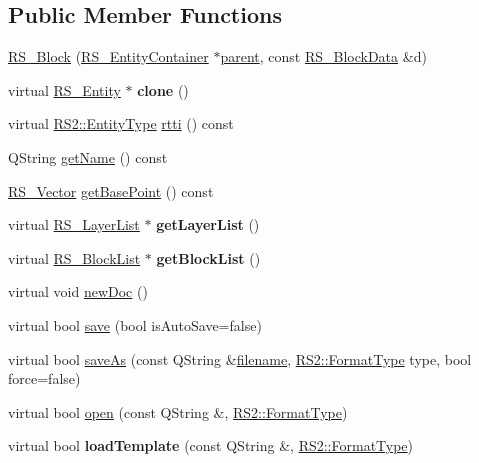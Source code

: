 \subsection*{Public Member Functions}
\begin{DoxyCompactItemize}
\item 
\hyperlink{classRS__Block_a6b07340f917f5fc95285761d3d46c391}{R\-S\-\_\-\-Block} (\hyperlink{classRS__EntityContainer}{R\-S\-\_\-\-Entity\-Container} $\ast$\hyperlink{classRS__Entity_a80358a8d2fc6739a516a278dc500b49f}{parent}, const \hyperlink{classRS__BlockData}{R\-S\-\_\-\-Block\-Data} \&d)
\item 
\hypertarget{classRS__Block_ab296caf344c57e9cf1f63a2e86312b38}{virtual \hyperlink{classRS__Entity}{R\-S\-\_\-\-Entity} $\ast$ {\bfseries clone} ()}\label{classRS__Block_ab296caf344c57e9cf1f63a2e86312b38}

\item 
virtual \hyperlink{classRS2_a8f26d1b981e1e85cff16738b43337e6a}{R\-S2\-::\-Entity\-Type} \hyperlink{classRS__Block_acfe58f363ff7e72ac42d51dbfd3f0b71}{rtti} () const 
\item 
Q\-String \hyperlink{classRS__Block_ac6d7125aa8638c743adbbe6b275ca304}{get\-Name} () const 
\item 
\hyperlink{classRS__Vector}{R\-S\-\_\-\-Vector} \hyperlink{classRS__Block_aa4f776303c15ed622bba648945e42738}{get\-Base\-Point} () const 
\item 
\hypertarget{classRS__Block_a74bcc0830b2d5c8bf8930ec7509dafb5}{virtual \hyperlink{classRS__LayerList}{R\-S\-\_\-\-Layer\-List} $\ast$ {\bfseries get\-Layer\-List} ()}\label{classRS__Block_a74bcc0830b2d5c8bf8930ec7509dafb5}

\item 
\hypertarget{classRS__Block_a110d71e74622afc4b3bc4ceeaf7212d4}{virtual \hyperlink{classRS__BlockList}{R\-S\-\_\-\-Block\-List} $\ast$ {\bfseries get\-Block\-List} ()}\label{classRS__Block_a110d71e74622afc4b3bc4ceeaf7212d4}

\item 
virtual void \hyperlink{classRS__Block_ab444087d5a42be6f9b27ef88ba468a6a}{new\-Doc} ()
\item 
virtual bool \hyperlink{classRS__Block_ab7a548d214963b2982954a6612df48dc}{save} (bool is\-Auto\-Save=false)
\item 
virtual bool \hyperlink{classRS__Block_af70feeeb48e6f59403d4a3fc307a8eb6}{save\-As} (const Q\-String \&\hyperlink{classRS__Document_aefd3d25d96ec31943bdfd1453031a423}{filename}, \hyperlink{classRS2_a077a6c94c9a0ab9962c4d4a612c7189b}{R\-S2\-::\-Format\-Type} type, bool force=false)
\item 
virtual bool \hyperlink{classRS__Block_a1ee689a437f6dbd4578d7073f61b52cb}{open} (const Q\-String \&, \hyperlink{classRS2_a077a6c94c9a0ab9962c4d4a612c7189b}{R\-S2\-::\-Format\-Type})
\item 
\hypertarget{classRS__Block_aea681487278b85482fd7997f7fb64b95}{virtual bool {\bfseries load\-Template} (const Q\-String \&, \hyperlink{classRS2_a077a6c94c9a0ab9962c4d4a612c7189b}{R\-S2\-::\-Format\-Type})}\label{classRS__Block_aea681487278b85482fd7997f7fb64b95}


\end{DoxyCompactItemize}
